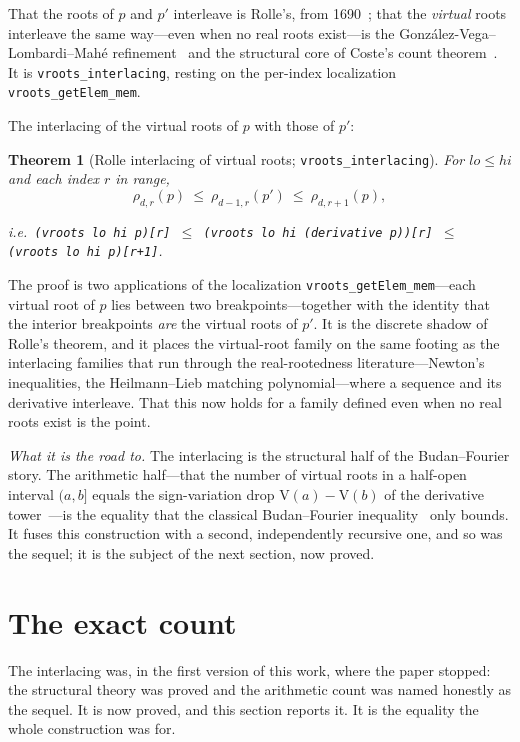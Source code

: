 \documentclass[11pt]{article}
\newtheorem{theorem}{Theorem}
\newcommand{\lean}[1]{\texttt{#1}}
\newcommand{\V}{\mathrm{V}}
\begin{document}
That the roots of $p$ and $p'$ interleave is Rolle's, from 1690~\cite{rolle}; that the \emph{virtual}
roots interleave the same way---even when no real roots exist---is the
Gonz\'alez-Vega--Lombardi--Mah\'e refinement~\cite{glm} and the structural core of Coste's count
theorem~\cite{coste}. It is \lean{vroots\_interlacing}, resting on the per-index localization
\lean{vroots\_getElem\_mem}.

The interlacing of the virtual roots of $p$
with those of $p'$:
\begin{theorem}[Rolle interlacing of virtual roots; \lean{vroots\_interlacing}]\label{thm:interlace}
For $lo\le hi$ and each index $r$ in range,
\[
  \rho_{d,r}(p)\ \le\ \rho_{d-1,r}(p')\ \le\ \rho_{d,r+1}(p),
\]
{\sloppy i.e.\ \lean{(vroots lo hi p)[r] $\le$ (vroots lo hi (derivative p))[r] $\le$ (vroots lo hi p)[r+1]}.\par}
\end{theorem}
\noindent The proof is two applications of the localization \lean{vroots\_getElem\_mem}---each virtual
root of $p$ lies between two breakpoints---together with the identity that the interior breakpoints
\emph{are} the virtual roots of $p'$. It is the discrete shadow of Rolle's theorem, and it places the
virtual-root family on the same footing as the interlacing families that run through the
real-rootedness literature---Newton's inequalities, the Heilmann--Lieb matching polynomial---where a
sequence and its derivative interleave. That this now holds for a family defined even when no real
roots exist is the point.

\emph{What it is the road to.} The interlacing is the structural half of the Budan--Fourier story.
The arithmetic half---that the number of virtual roots in a half-open interval $(a,b]$ equals the
sign-variation drop $\V(a)-\V(b)$ of the derivative tower~\cite{coste}---is the equality that the
classical Budan--Fourier inequality~\cite{bflean} only bounds. It fuses this construction with a
second, independently recursive one, and so was the sequel; it is the subject of the next section, now
proved.

\section{The exact count}\label{sec:count}

The interlacing was, in the first version of this work, where the paper stopped: the structural theory
was proved and the arithmetic count was named honestly as the sequel. It is now proved, and this
section reports it. It is the equality the whole construction was for.
\end{document}
